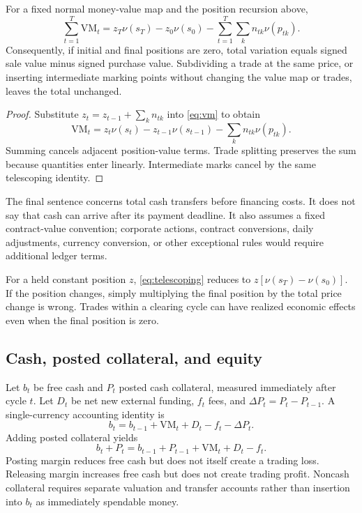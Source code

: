 \begin{theorem}\label{thm:telescoping}
For a fixed normal money-value map and the position recursion above,
\begin{equation}
 \sum_{t=1}^T\mathrm{VM}_t
 =z_T\nu(s_T)-z_0\nu(s_0)
       -\sum_{t=1}^T\sum_kn_{tk}\nu(p_{tk}).
\label{eq:telescoping}
\end{equation}
Consequently, if initial and final positions are zero, total variation equals signed sale value minus signed purchase value. Subdividing a trade at the same price, or inserting intermediate marking points without changing the value map or trades, leaves the total unchanged.
\end{theorem}
\begin{proof}
Substitute $z_t=z_{t-1}+\sum_kn_{tk}$ into \eqref{eq:vm} to obtain
\[
 \mathrm{VM}_t=z_t\nu(s_t)-z_{t-1}\nu(s_{t-1})
                 -\sum_kn_{tk}\nu(p_{tk}).
\]
Summing cancels adjacent position-value terms. Trade splitting preserves the sum because quantities enter linearly. Intermediate marks cancel by the same telescoping identity.
\end{proof}

The final sentence concerns total cash transfers before financing costs. It does not say that cash can arrive after its payment deadline. It also assumes a fixed contract-value convention; corporate actions, contract conversions, daily adjustments, currency conversion, or other exceptional rules would require additional ledger terms.

For a held constant position $z$, \eqref{eq:telescoping} reduces to $z[\nu(s_T)-\nu(s_0)]$. If the position changes, simply multiplying the final position by the total price change is wrong. Trades within a clearing cycle can have realized economic effects even when the final position is zero.

\subsection{Cash, posted collateral, and equity}

Let $b_t$ be free cash and $P_t$ posted cash collateral, measured immediately after cycle $t$. Let $D_t$ be net new external funding, $f_t$ fees, and $\Delta P_t=P_t-P_{t-1}$. A single-currency accounting identity is
\begin{equation}
 b_t=b_{t-1}+\mathrm{VM}_t+D_t-f_t-\Delta P_t.
\label{eq:cash}
\end{equation}
Adding posted collateral yields
\begin{equation}
 b_t+P_t=b_{t-1}+P_{t-1}+\mathrm{VM}_t+D_t-f_t.
\end{equation}
Posting margin reduces free cash but does not itself create a trading loss. Releasing margin increases free cash but does not create trading profit. Noncash collateral requires separate valuation and transfer accounts rather than insertion into $b_t$ as immediately spendable money.

